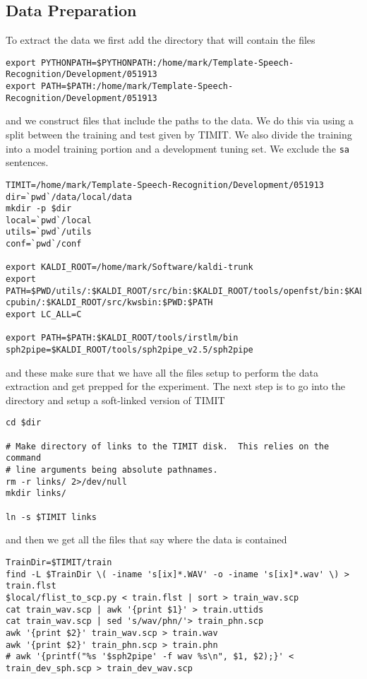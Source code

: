 \documentclass{article}
\begin{document}
\subsection{Data Preparation}

To extract the data we first add the directory that will contain the files
\begin{verbatim}
export PYTHONPATH=$PYTHONPATH:/home/mark/Template-Speech-Recognition/Development/051913
export PATH=$PATH:/home/mark/Template-Speech-Recognition/Development/051913
\end{verbatim}
and we construct files that include the paths to the data.
We do this via using a split between the training and test given
by TIMIT. We also divide the training into a model training portion
and a development tuning set.  We exclude the \texttt{sa} sentences.
\begin{verbatim}
TIMIT=/home/mark/Template-Speech-Recognition/Development/051913
dir=`pwd`/data/local/data
mkdir -p $dir
local=`pwd`/local
utils=`pwd`/utils
conf=`pwd`/conf

export KALDI_ROOT=/home/mark/Software/kaldi-trunk
export PATH=$PWD/utils/:$KALDI_ROOT/src/bin:$KALDI_ROOT/tools/openfst/bin:$KALDI_ROOT/tools/irstlm/bin/:$KALDI_ROOT/src/fstbin/:$KALDI_ROOT/src/gmmbin/:$KALDI_ROOT/src/featbin/:$KALDI_ROOT/src/lm/:$KALDI_ROOT/src/sgmmbin/:$KALDI_ROOT/src/sgmm2bin/:$KALDI_ROOT/src/fgmmbin/:$KALDI_ROOT/src/latbin/:$KALDI_ROOT/src/nnetbin:$KALDI_ROOT/src/nnet-cpubin/:$KALDI_ROOT/src/kwsbin:$PWD:$PATH
export LC_ALL=C

export PATH=$PATH:$KALDI_ROOT/tools/irstlm/bin
sph2pipe=$KALDI_ROOT/tools/sph2pipe_v2.5/sph2pipe
\end{verbatim}
and these make sure that we have all the files setup to 
perform the data extraction and get prepped for the experiment.
The next step is to go into the directory and setup a soft-linked
version of TIMIT
\begin{verbatim}
cd $dir

# Make directory of links to the TIMIT disk.  This relies on the command
# line arguments being absolute pathnames.
rm -r links/ 2>/dev/null
mkdir links/

ln -s $TIMIT links
\end{verbatim}
and then we get all the files that say where the data is contained
\begin{verbatim}
TrainDir=$TIMIT/train
find -L $TrainDir \( -iname 's[ix]*.WAV' -o -iname 's[ix]*.wav' \) > train.flst
$local/flist_to_scp.py < train.flst | sort > train_wav.scp
cat train_wav.scp | awk '{print $1}' > train.uttids
cat train_wav.scp | sed 's/wav/phn/'> train_phn.scp
awk '{print $2}' train_wav.scp > train.wav
awk '{print $2}' train_phn.scp > train.phn
# awk '{printf("%s '$sph2pipe' -f wav %s\n", $1, $2);}' < train_dev_sph.scp > train_dev_wav.scp
\end{verbatim}
\end{document}
